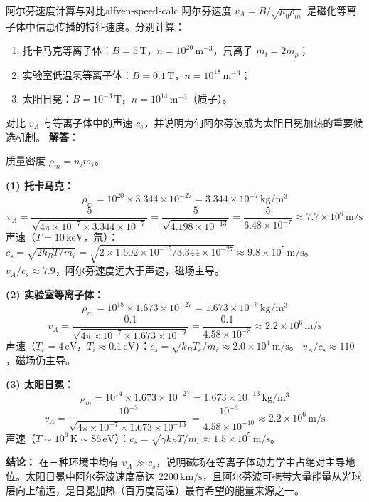 \begin{example}{阿尔芬速度计算与对比}{alfven-speed-calc}
阿尔芬速度 $v_A = B/\sqrt{\mu_0\rho_m}$ 是磁化等离子体中信息传播的特征速度。分别计算：
\begin{enumerate}[label=(\arabic*)]
\item 托卡马克等离子体：$B=5\,\mathrm{T}$，$n=10^{20}\,\mathrm{m}^{-3}$，氘离子 $m_i=2m_p$；
\item 实验室低温氢等离子体：$B=0.1\,\mathrm{T}$，$n=10^{18}\,\mathrm{m}^{-3}$；
\item 太阳日冕：$B=10^{-3}\,\mathrm{T}$，$n=10^{14}\,\mathrm{m}^{-3}$（质子）。
\end{enumerate}
对比 $v_A$ 与等离子体中的声速 $c_s$，并说明为何阿尔芬波成为太阳日冕加热的重要候选机制。
\tcblower
\textbf{解答：}

质量密度 $\rho_m = n_i m_i$。

\textbf{(1) 托卡马克：}
\[
\rho_m = 10^{20}\times 3.344\times 10^{-27} = 3.344\times 10^{-7}\,\mathrm{kg/m^3}
\]
\[
v_A = \frac{5}{\sqrt{4\pi\times 10^{-7}\times 3.344\times 10^{-7}}} = \frac{5}{\sqrt{4.198\times 10^{-13}}} = \frac{5}{6.48\times 10^{-7}} \approx 7.7\times 10^6\,\mathrm{m/s}
\]
声速（$T=10\,\mathrm{keV}$，氘）：$c_s = \sqrt{2k_{\!B}T/m_i} = \sqrt{2\times 1.602\times 10^{-15}/3.344\times 10^{-27}} \approx 9.8\times 10^5\,\mathrm{m/s}$。
$v_A / c_s \approx 7.9$，阿尔芬速度远大于声速，磁场主导。

\textbf{(2) 实验室等离子体：}
\[
\rho_m = 10^{18}\times 1.673\times 10^{-27} = 1.673\times 10^{-9}\,\mathrm{kg/m^3}
\]
\[
v_A = \frac{0.1}{\sqrt{4\pi\times 10^{-7}\times 1.673\times 10^{-9}}} = \frac{0.1}{4.58\times 10^{-8}} \approx 2.2\times 10^6\,\mathrm{m/s}
\]
声速（$T_e=4\,\mathrm{eV}$，$T_i\approx 0.1\,\mathrm{eV}$）：$c_s = \sqrt{k_{\!B}T_e/m_i} \approx 2.0\times 10^4\,\mathrm{m/s}$。
$v_A / c_s \approx 110$，磁场仍主导。

\textbf{(3) 太阳日冕：}
\[
\rho_m = 10^{14}\times 1.673\times 10^{-27} = 1.673\times 10^{-13}\,\mathrm{kg/m^3}
\]
\[
v_A = \frac{10^{-3}}{\sqrt{4\pi\times 10^{-7}\times 1.673\times 10^{-13}}} = \frac{10^{-3}}{4.58\times 10^{-10}} \approx 2.2\times 10^6\,\mathrm{m/s}
\]
声速（$T\sim 10^6\,\mathrm{K}\sim 86\,\mathrm{eV}$）：$c_s = \sqrt{\gamma k_{\!B}T/m_i} \approx 1.5\times 10^5\,\mathrm{m/s}$。

\textbf{结论：} 在三种环境中均有 $v_A \gg c_s$，说明磁场在等离子体动力学中占绝对主导地位。太阳日冕中阿尔芬波速度高达 $2200\,\mathrm{km/s}$，且阿尔芬波可携带大量能量从光球层向上输运，是日冕加热（百万度高温）最有希望的能量来源之一。
\end{example}

